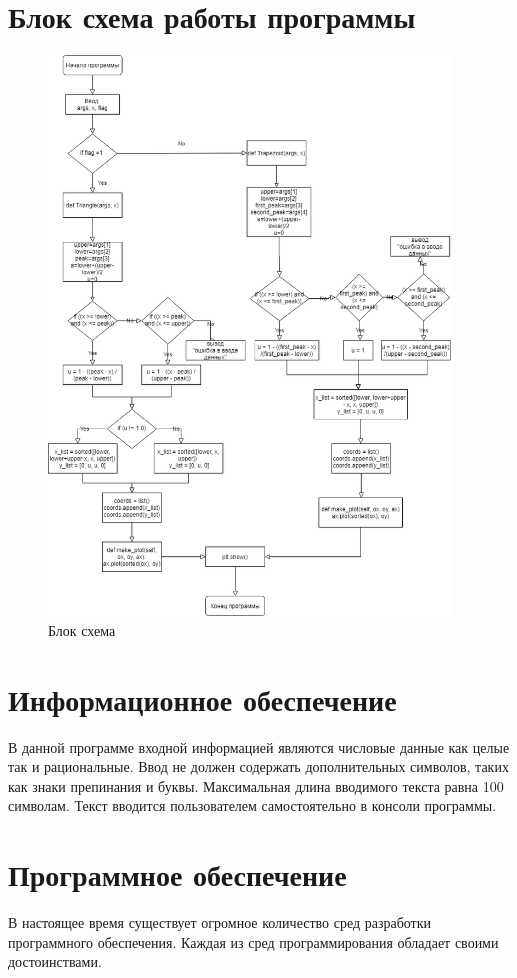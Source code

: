 \documentclass[12pt,a4paper]{report}
\begin{document}
\section{Блок схема работы программы}
\begin{figure}[h!]
	\centering
	\includegraphics[width=0.95\textwidth, keepaspectratio]{diagram.png}
	\caption{Блок схема} 
\end{figure}

\section{Информационное обеспечение}
В данной программе входной информацией являются числовые данные как целые так и рациональные. Ввод не должен содержать дополнительных символов, таких как знаки препинания и буквы. Максимальная длина вводимого текста равна 100 символам. Текст вводится пользователем самостоятельно в консоли программы.

\section{Программное обеспечение}
В настоящее время существует огромное количество сред разработки
программного обеспечения. Каждая из сред программирования обладает
своими достоинствами. 
\end{document}

